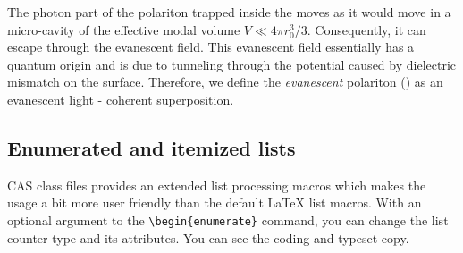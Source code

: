 \documentclass[a4paper,12pt]{article}
\begin{document}
\begin{enumerate}
\begin{vquote}
\begin{pot}
 The photon part of the polariton trapped inside the \PMS
 moves as it would move in a micro-cavity of the effective
 modal volume $V \ll 4 \pi r_{0}^{3} /3$. Consequently, it
 can escape through the evanescent field. This evanescent
 field essentially has a quantum origin and is due to
 tunneling through the potential caused by dielectric
 mismatch on the \PMS surface. Therefore, we define the
 \emph{evanescent} polariton (\EP) as an evanescent light -
 \QE coherent superposition.
\end{pot}
\end{vquote}

\end{enumerate}

\subsection{Enumerated and itemized lists}

CAS class files provides an extended list processing macros
which makes the usage a bit more user friendly than the
default LaTeX list macros. With an optional argument to the
\verb+\begin{enumerate}+ command, you can change the list
counter type and its attributes. You can see the coding and
typeset copy. 

\end{document}
